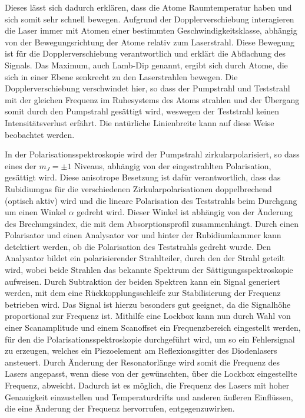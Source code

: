 \documentclass[11pt, a4paper]{article}
\numberwithin{equation}{section}
\begin{document}
Dieses lässt sich dadurch erklären, dass die Atome Raumtemperatur haben und sich somit sehr schnell bewegen.
Aufgrund der Dopplerverschiebung interagieren die Laser immer mit Atomen einer bestimmten Geschwindigkeitsklasse, abhängig von der Bewegungsrichtung der Atome relativ zum Laserstrahl.
Diese Bewegung ist für die Dopplerverschiebung verantwortlich und erklärt die Abflachung des Signals.
Das Maximum, auch Lamb-Dip genannt, ergibt sich durch Atome, die sich in einer Ebene senkrecht zu den Laserstrahlen bewegen.
Die Dopplerverschiebung verschwindet hier, so dass der Pumpstrahl und Teststrahl mit der gleichen Frequenz im Ruhesystems des Atoms strahlen und der Übergang somit durch den Pumpstrahl gesättigt wird, weswegen der Teststrahl keinen Intensitätsverlust erfährt.
Die natürliche Linienbreite kann auf diese Weise beobachtet werden.

In der Polarisationsspektroskopie wird der Pumpstrahl zirkularpolarisiert, so dass eines der $m_J=\pm1$ Niveaus, abhängig von der eingestrahlten Polarisation, gesättigt wird.
Diese anisotrope Besetzung ist dafür verantwortlich, dass das Rubidiumgas für die verschiedenen Zirkularpolarisationen doppelbrechend (optisch aktiv) wird und die lineare Polarisation des Teststrahls beim Durchgang um einen Winkel $\alpha$ gedreht wird.
Dieser Winkel ist abhängig von der Änderung des Brechungsindex, die mit dem Absorptionsprofil zusammenhängt.
Durch einen Polarisator und einen Analysator vor und hinter der Rubidiumkammer kann detektiert werden, ob die Polarisation des Teststrahls gedreht wurde.
Den Analysator bildet ein polarisierender Strahlteiler, durch den der Strahl geteilt wird, wobei beide Strahlen das bekannte Spektrum der Sättigungsspektroskopie aufweisen.
Durch Subtraktion der beiden Spektren kann ein Signal generiert werden, mit dem eine Rückkopplungsschleife zur Stabilisierung der Frequenz betrieben wird.
Das Signal ist hierzu besonders gut geeignet, da die Signalhöhe proportional zur Frequenz ist.
Mithilfe eine Lockbox kann nun durch Wahl von einer Scanamplitude und einem Scanoffset ein Frequenzbereich eingestellt werden, für den die Polarisationsspektroskopie durchgeführt wird, um so ein Fehlersignal zu erzeugen, welches ein Piezoelement am Reflexionsgitter des Diodenlasers ansteuert.
Durch Änderung der Resonatorlänge wird somit die Frequenz des Lasers angepasst, wenn diese von der gewünschten, über die Lockbox eingestellte Frequenz, abweicht.
Dadurch ist es möglich, die Frequenz des Lasers mit hoher Genauigkeit einzustellen und Temperaturdrifts und anderen äußeren Einflüssen, die eine Änderung der Frequenz hervorrufen, entgegenzuwirken.
\end{document}
